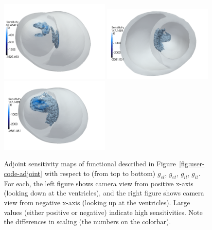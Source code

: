 \documentclass[a4paper, reqno]{amsart}
\numberwithin{equation}{section}
\begin{document}
\begin{figure}
  \includegraphics[width=0.49\textwidth]{png/g_il_minusx.png}
  \includegraphics[width=0.49\textwidth]{png/g_it_plusx.png}
  \includegraphics[width=0.49\textwidth]{png/g_it_minusx.png}

\caption{Adjoint sensitivity maps of functional described in
  Figure~\ref{fig:user-code-adjoint} with respect to (from top to
  bottom) $g_{el}$, $g_{et}$, $g_{il}$, $g_{it}$. For each, the left
  figure shows camera view from positive x-axis (looking down at the
  ventricles), and the right figure shows camera view from negative
  x-axis (looking up at the ventricles). Large values (either positive
  or negative) indicate high sensitivities. Note the differences in
  scaling (the numbers on the colorbar). }
\label{fig:sensitivity-maps}
\end{figure}


 
\end{document}
